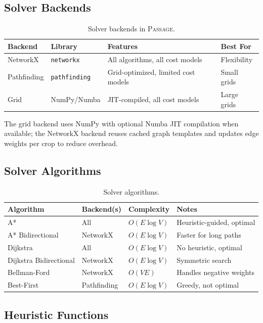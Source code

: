 \documentclass{article}
\newcommand{\dataset}{\textsc{Passage}}
\begin{document}
\subsection{Solver Backends}

\begin{table}[h]
\centering
\caption{Solver backends in \dataset{}.}
\label{tab:backends}
\begin{tabular}{llll}
\toprule
Backend & Library & Features & Best For \\
\midrule
NetworkX & \texttt{networkx} & All algorithms, all cost models & Flexibility \\
Pathfinding & \texttt{pathfinding} & Grid-optimized, limited cost models & Small grids \\
Grid & NumPy/Numba & JIT-compiled, all cost models & Large grids \\
\bottomrule
\end{tabular}
\end{table}

The grid backend uses NumPy with optional Numba JIT compilation when available; the NetworkX backend reuses cached graph templates and updates edge weights per crop to reduce overhead.

\subsection{Solver Algorithms}

\begin{table}[h]
\centering
\caption{Solver algorithms.}
\label{tab:algorithms}
\begin{tabular}{llll}
\toprule
Algorithm & Backend(s) & Complexity & Notes \\
\midrule
A* & All & $O(E \log V)$ & Heuristic-guided, optimal \\
A* Bidirectional & NetworkX & $O(E \log V)$ & Faster for long paths \\
Dijkstra & All & $O(E \log V)$ & No heuristic, optimal \\
Dijkstra Bidirectional & NetworkX & $O(E \log V)$ & Symmetric search \\
Bellman-Ford & NetworkX & $O(VE)$ & Handles negative weights \\
Best-First & Pathfinding & $O(E \log V)$ & Greedy, not optimal \\
\bottomrule
\end{tabular}
\end{table}

\subsection{Heuristic Functions}
\end{document}
